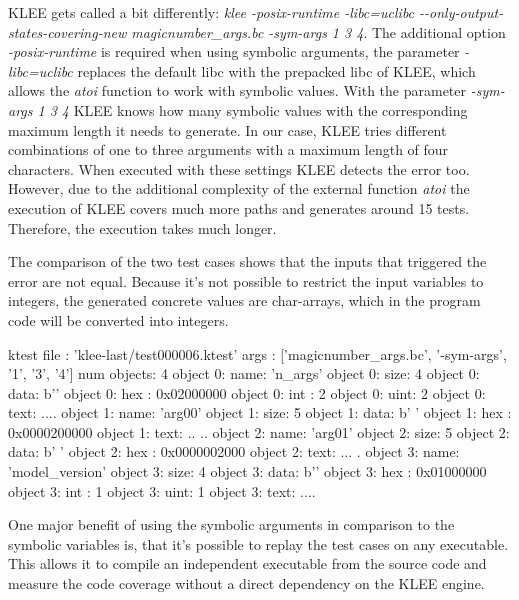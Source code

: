 KLEE gets called a bit differently: \textit{klee -posix-runtime -libc=uclibc -{}-only-output-states-covering-new magicnumber\_args.bc -sym-args 1 3 4}.
The additional option \textit{-posix-runtime} is required when using symbolic arguments, the parameter \textit{-libc=uclibc} replaces the default libc with the prepacked libc of KLEE, which allows the \textit{atoi} function to work with symbolic values.
With the parameter \textit{-sym-args 1 3 4} KLEE knows how many symbolic values with the corresponding maximum length it needs to generate. In our case, KLEE tries different combinations of one to three arguments with a maximum length of four characters.
When executed with these settings KLEE detects the error too. However, due to the additional complexity of the external function \textit{atoi} the execution of KLEE covers much more paths and generates around 15 tests. Therefore, the execution takes much longer.

The comparison of the two test cases shows that the inputs that triggered the error are not equal.
Because it's not possible to restrict the input variables to integers, the generated concrete values are char-arrays, which in the program code will be converted into integers.

\begin{customlisting}[caption={The test case generated by KLEE which triggers the assertion error when executing it on the code snippet \ref{codeSnippet:klee_arguments}.}, label={listing:test_case_two}]
ktest file : 'klee-last/test000006.ktest'
args       : ['magicnumber_args.bc',
              '-sym-args', '1', '3', '4']
num objects: 4
object 0: name: 'n_args'
object 0: size: 4
object 0: data: b''
object 0: hex : 0x02000000
object 0: int : 2
object 0: uint: 2
object 0: text: ....
object 1: name: 'arg00'
object 1: size: 5
object 1: data: b' '
object 1: hex : 0x0000200000
object 1: text: .. ..
object 2: name: 'arg01'
object 2: size: 5
object 2: data: b' '
object 2: hex : 0x0000002000
object 2: text: ... .
object 3: name: 'model_version'
object 3: size: 4
object 3: data: b''
object 3: hex : 0x01000000
object 3: int : 1
object 3: uint: 1
object 3: text: ....
\end{customlisting}

One major benefit of using the symbolic arguments in comparison to the symbolic variables is, that it's possible to replay the test cases on any executable.
This allows it to compile an independent executable from the source code and measure the code coverage without a direct dependency on the KLEE engine.

